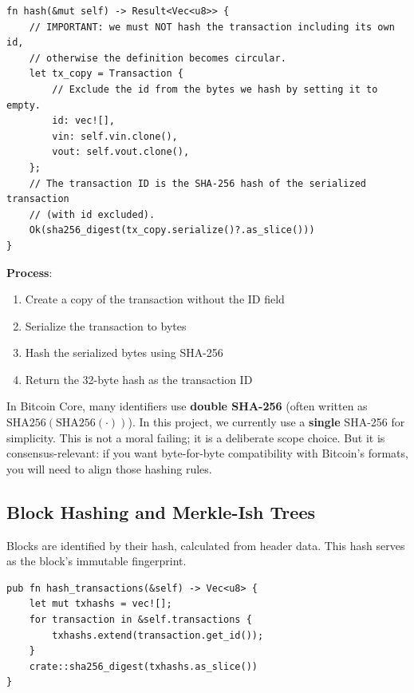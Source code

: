 \begin{listing}[htbp]
\caption{Computing transaction ID from content ()}
\label{lst:ch08-tx-hash}
\begin{verbatim}
fn hash(&mut self) -> Result<Vec<u8>> {
    // IMPORTANT: we must NOT hash the transaction including its own id,
    // otherwise the definition becomes circular.
    let tx_copy = Transaction {
        // Exclude the id from the bytes we hash by setting it to empty.
        id: vec![],
        vin: self.vin.clone(),
        vout: self.vout.clone(),
    };
    // The transaction ID is the SHA-256 hash of the serialized transaction
    // (with id excluded).
    Ok(sha256_digest(tx_copy.serialize()?.as_slice()))
}
\end{verbatim}
\end{listing}

\textbf{Process}:
\begin{enumerate}
  \item Create a copy of the transaction without the ID field
  \item Serialize the transaction to bytes
  \item Hash the serialized bytes using SHA-256
  \item Return the 32-byte hash as the transaction ID
\end{enumerate}

\begin{notebox}
In Bitcoin Core, many identifiers use \textbf{double SHA-256} (often written as $\text{SHA256}(\text{SHA256}(\cdot))$). In this project, we currently use a \textbf{single} SHA-256 for simplicity. This is not a moral failing; it is a deliberate scope choice. But it is consensus-relevant: if you want byte-for-byte compatibility with Bitcoin's formats, you will need to align those hashing rules.
\end{notebox}

\subsection{Block Hashing and Merkle-Ish Trees}
\label{sec:ch08-block-hashing}

Blocks are identified by their hash, calculated from header data. This hash serves as the block's immutable fingerprint.

\begin{listing}[htbp]
\caption{Hashing block transactions ()}
\label{lst:ch08-block-hash}
\begin{verbatim}
pub fn hash_transactions(&self) -> Vec<u8> {
    let mut txhashs = vec![];
    for transaction in &self.transactions {
        txhashs.extend(transaction.get_id());
    }
    crate::sha256_digest(txhashs.as_slice())
}
\end{verbatim}
\end{listing}

